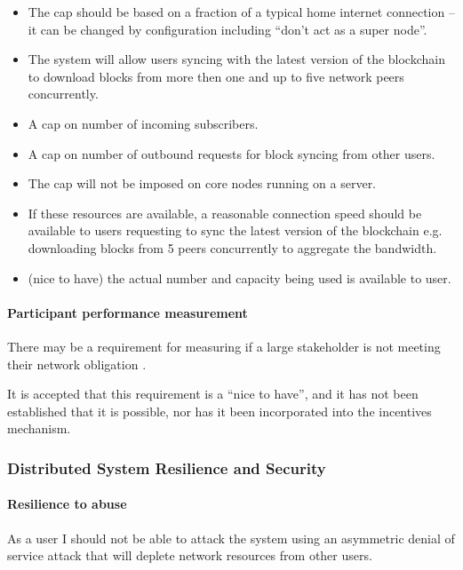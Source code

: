 \documentclass{report}
\theoremstyle{definition}{
  \newtheorem{lemma}{Lemma}[section] %
  \newtheorem{definition}[lemma]{Definition}
}
\theoremstyle{theorem}{
  \newtheorem{invariant}[lemma]{Invariant}
  \newtheorem{proofobligation}[lemma]{Proof Obligation}
}
\numberwithin{equation}{lemma}
\begin{document}
\begin{itemize}
\item The cap should be based on a fraction of a typical home internet
      connection -- it can be changed by configuration including ``don't act
      as a super node''.
\item The system will allow users syncing with the latest version of the
      blockchain to download blocks from more then one and up to five network
      peers concurrently.
\item A cap on number of incoming subscribers.
\item A cap on number of outbound requests for block syncing from other users.
\item The cap will not be imposed on core nodes running on a server.
\item If these resources are available, a reasonable connection speed should be
      available to users requesting to sync the latest version of the
      blockchain e.g. downloading blocks from 5 peers concurrently to aggregate
      the bandwidth.
\item (nice to have) the actual number and capacity being used is available to
      user.
\end{itemize}

\paragraph{Participant performance measurement}

There may be a requirement for measuring if a large stakeholder is not meeting
their network obligation \cite{DBLP:journals/corr/abs-1807-11218}.

It is accepted that this requirement is a ``nice to have'', and it has not been
established that it is possible, nor has it been incorporated into the
incentives mechanism.

\subsubsection{Distributed System Resilience and Security}

\paragraph{Resilience to abuse}

As a user I should not be able to attack the system using an asymmetric denial
of service attack that will deplete network resources from other users.
\end{document}
